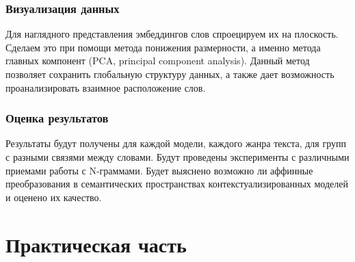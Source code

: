 \documentclass[a4paper,14pt]{article}
\begin{document}

	
\subsubsection{Визуализация данных}

Для наглядного представления эмбеддингов слов спроецируем их на плоскость.
Сделаем это при помощи метода понижения размерности, а именно метода главных компонент (PCA, principal component analysis).
Данный метод позволяет сохранить глобальную структуру данных, а также дает возможность проанализировать взаимное расположение слов.

\subsubsection{Оценка результатов}

Результаты будут получены для каждой модели, каждого жанра текста, для групп с разными связями между словами.
Будут проведены эксперименты с различными приемами работы с N-граммами.
Будет выяснено возможно ли аффинные преобразования в семантических пространствах контекстуализированных моделей и оценено их качество.

\newpage
\section{Практическая часть}
\end{document}
